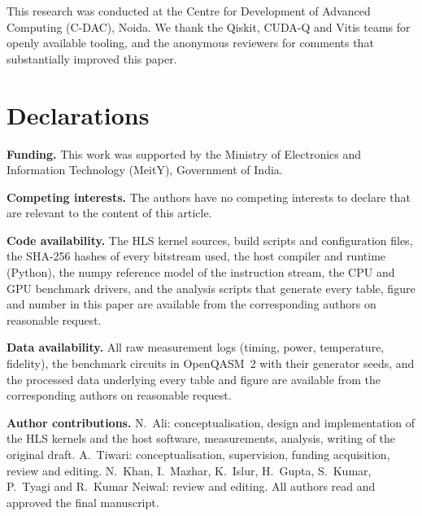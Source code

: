 This research was conducted at the Centre for Development of Advanced Computing (C-DAC), Noida. We thank the Qiskit, CUDA-Q and Vitis teams for openly available tooling, and the anonymous reviewers for comments that substantially improved this paper.

\section*{Declarations}

\textbf{Funding.} This work was supported by the Ministry of Electronics and Information Technology (MeitY), Government of India.

\textbf{Competing interests.} The authors have no competing interests to declare that are relevant to the content of this article.

\textbf{Code availability.} The HLS kernel sources, build scripts and configuration files, the SHA-256 hashes of every bitstream used, the host compiler and runtime (Python), the numpy reference model of the instruction stream, the CPU and GPU benchmark drivers, and the analysis scripts that generate every table, figure and number in this paper are available from the corresponding authors on reasonable request.

\textbf{Data availability.} All raw measurement logs (timing, power, temperature, fidelity), the benchmark circuits in OpenQASM~2 with their generator seeds, and the processed data underlying every table and figure are available from the corresponding authors on reasonable request.

\textbf{Author contributions.} N.~Ali: conceptualisation, design and implementation of the HLS kernels and the host software, measurements, analysis, writing of the original draft. A.~Tiwari: conceptualisation, supervision, funding acquisition, review and editing. N.~Khan, I.~Mazhar, K.~Islur, H.~Gupta, S.~Kumar, P.~Tyagi and R.~Kumar Neiwal: review and editing. All authors read and approved the final manuscript.
